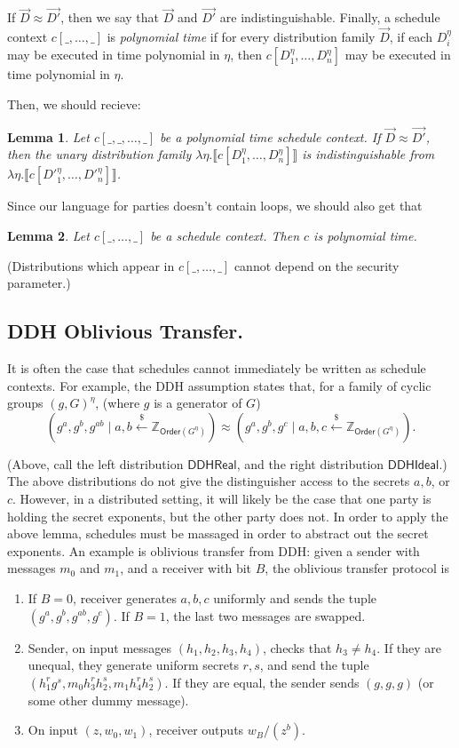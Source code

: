 \documentclass{article}
\newtheorem{lemma}{Lemma}
\begin{document}
If $\vec{D} \approx \vec{D'}$, then we say that $\vec{D}$ and $\vec{D'}$ are indistinguishable.
Finally, a schedule context $c[\_, \dots, \_]$ is \emph{polynomial time} if for every distribution family $\vec{D}$, if each $D_i^\eta$ may be executed in time polynomial in $\eta$, then $c[D_1^\eta, \dots, D_n^\eta]$ may be executed in time polynomial in $\eta$.

Then, we should recieve:
\begin{lemma}
    Let $c[\_, \_, \dots, \_]$ be a polynomial time schedule context. If $\vec{D} \approx \vec{D'}$, then the unary distribution family $\lambda \eta. \llbracket c[D_1^\eta, \dots, D_n^\eta] \rrbracket$ is indistinguishable from $\lambda \eta. \llbracket c[D'^\eta_1, \dots, D'^\eta_n] \rrbracket$.
\end{lemma}

Since our language for parties doesn't contain loops, we should also get that
\begin{lemma}
    Let $c[\_, \dots, \_]$ be a schedule context. Then $c$ is polynomial time.
\end{lemma}

(Distributions which appear in $c[\_, \dots, \_]$ cannot depend on the security parameter.)

\subsection{DDH Oblivious Transfer.}
It is often the case that schedules cannot immediately be written as schedule contexts. For example, the DDH assumption states that, for a family of cyclic groups $(g,G)^\eta$, (where $g$ is a generator of $G$)
\[(g^a, g^b, g^{ab} \mid a,b \xleftarrow{\$} \mathbb{Z}_{\mathsf{Order}(G^\eta)}) \approx (g^a, g^b, g^c \mid a,b,c \xleftarrow{\$} \mathbb{Z}_{\textsf{Order}(G^\eta)}).\]

(Above, call the left distribution $\mathsf{DDHReal}$, and the right distribution $\mathsf{DDHIdeal}$.)
The above distributions do not give the distinguisher access to the secrets $a,b$, or $c$. However, in a distributed setting, it will likely be the case that one party is holding the secret exponents, but the other party does not. In order to apply the above lemma, schedules must be massaged in order to abstract out the secret exponents. An example is oblivious transfer from DDH: given a sender with messages $m_0$ and $m_1$, and a receiver with bit $B$, the oblivious transfer protocol is


\begin{enumerate}
    \item If $B=0$, receiver generates $a,b,c$ uniformly and sends the tuple $(g^a, g^b, g^{ab}, g^c)$. If $B=1$, the last two messages are swapped.
    \item Sender, on input messages $(h_1, h_2, h_3, h_4)$, checks that $h_3 \neq h_4$. If they are unequal, they generate uniform secrets $r,s$, and send the tuple $(h_1^r g^s, m_0 h_3^r h_2^s, m_1 h_4^r h_2^s)$. If they are equal, the sender sends $(g, g, g)$ (or some other dummy message).
    \item On input $(z, w_0, w_1)$, receiver outputs $w_B / (z^b)$.
\end{enumerate}
\end{document}
